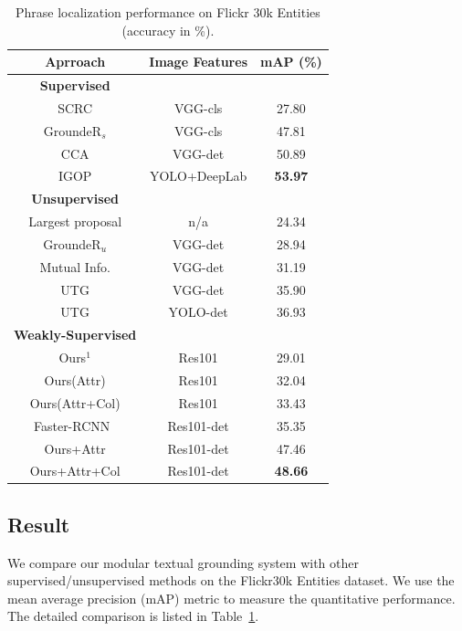 \begin{table}[htbp]
\begin{center}
\caption{Phrase localization performance on Flickr 30k Entities (accuracy
in \%). }
\begin{tabular}{c c c}
\toprule
Aprroach & Image Features & mAP (\%)\\
\hline
\textbf{Supervised} \Tstrut\\
SCRC \citep{hu2016natural} & VGG-cls & 27.80\\
GroundeR$_{s}$ \citep{rohrbach2016grounding} & VGG-cls & 47.81\\
CCA \citep{plummer2015flickr30k} &  VGG-det & 50.89\\
IGOP \citep{yeh2017interpretable} &  YOLO+DeepLab & \textbf{53.97}\\
\hline
\textbf{Unsupervised} \Tstrut\\
Largest proposal & n/a &  24.34\\
GroundeR$_{u}$ \citep{rohrbach2016grounding} & VGG-det & 28.94\\
Mutual Info. \citep{zitnick2013learning} & VGG-det & 31.19\\
UTG \citep{yeh2018unsupervised} & VGG-det & 35.90\\
UTG \citep{yeh2018unsupervised} & YOLO-det & 36.93\\
\hline
\textbf{Weakly-Supervised}\Tstrut\\
Ours$^{1}$  & Res101&  29.01\Tstrut\\
Ours(Attr)   & Res101& 32.04\\
Ours(Attr+Col)  & Res101& 33.43\\
Faster-RCNN~\citep{ren2015faster} & Res101-det& 35.35\\
Ours+Attr   & Res101-det& 47.46\\
Ours+Attr+Col  & Res101-det& \textbf{48.66}\\
\bottomrule
\end{tabular}
\end{center}
\label{table:flickr}
\end{table}



\subsection{Result}
We compare our modular textual grounding system with
other supervised/unsupervised methods on the Flickr30k Entities dataset.
We use the mean average precision (mAP) metric to measure the quantitative performance.
The detailed comparison is listed in Table~\ref{table:flickr}.

